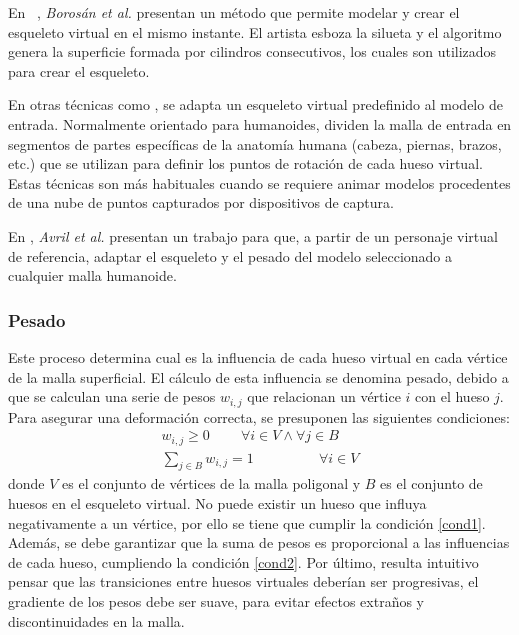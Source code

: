 En ~\cite{borosan2012rigmesh}, \emph{Borosán et al.} presentan un método que permite modelar y crear el esqueleto virtual en el mismo instante. El artista esboza la silueta y el algoritmo genera la superficie formada por cilindros consecutivos, los cuales son utilizados para crear el esqueleto.


En otras técnicas como \cite{huang2013robust}, se adapta un esqueleto virtual predefinido al modelo de entrada. Normalmente orientado para humanoides, dividen la malla de entrada en segmentos de partes específicas de la anatomía humana (cabeza, piernas, brazos, etc.) que se utilizan para definir los puntos de rotación de cada hueso virtual. Estas técnicas son más habituales cuando se requiere animar modelos procedentes de una nube de puntos capturados por dispositivos de captura.

En \cite{avril2016animation}, \emph{Avril et al.} presentan un trabajo para que, a partir de un personaje virtual de referencia, adaptar el esqueleto y el pesado del modelo seleccionado a cualquier malla humanoide.


\subsubsection{Pesado}
\label{art:pesado}

Este proceso determina cual es la influencia de cada hueso virtual en cada vértice de la malla superficial.
El cálculo de esta influencia se denomina pesado, debido a que se calculan una serie de pesos $w_{i,j}$ que relacionan un vértice $i$ con el hueso $j$.
Para asegurar una deformación correcta, se presuponen las siguientes condiciones:
\begin{eqnarray}
\label{cond1}
w_{i,j}\geq 0 \;\;\;\;\;\;\;\; \forall i \in V \wedge \forall j \in B   \\
\label{cond2}
\sum_{j \in B} w_{i,j} = 1\ \;\;\;\;\;\;\;\;\;\;\;\;\;\;\;\;
\forall i \in V
\end{eqnarray}
donde $V$ es el conjunto de vértices de la malla poligonal y $B$ es el conjunto de huesos en el esqueleto virtual. No puede existir un hueso que influya negativamente a un vértice, por ello se tiene que cumplir la condición \ref{cond1}. %
Además, se debe garantizar que la suma de pesos es proporcional a las influencias de cada hueso, cumpliendo la condición \ref{cond2}.
Por último, resulta intuitivo pensar que las transiciones entre huesos virtuales deberían ser progresivas, el gradiente de los pesos debe ser suave, para evitar efectos extraños y discontinuidades en la malla.

